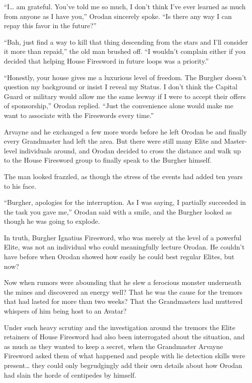\documentclass[a4paper,10pt]{book}
\begin{document}
“I… am grateful. You’ve told me so much, I don’t think I’ve ever learned as much from anyone as I have you,” Orodan sincerely spoke. “Is there any way I can repay this favor in the future?”\par
“Bah, just find a way to kill that thing descending from the stars and I’ll consider it more than repaid,” the old man brushed off. “I wouldn’t complain either if you decided that helping House Firesword in future loops was a priority.”\par
“Honestly, your house gives me a luxurious level of freedom. The Burgher doesn’t question my background or insist I reveal my Status. I don’t think the Capital Guard or military would allow me the same leeway if I were to accept their offers of sponsorship,” Orodan replied. “Just the convenience alone would make me want to associate with the Fireswords every time.”\par
Arvayne and he exchanged a few more words before he left Orodan be and finally every Grandmaster had left the area. But there were still many Elite and Master-level individuals around, and Orodan decided to cross the distance and walk up to the House Firesword group to finally speak to the Burgher himself.\par
The man looked frazzled, as though the stress of the events had added ten years to his face.\par
“Burgher, apologies for the interruption. As I was saying, I partially succeeded in the task you gave me,” Orodan said with a smile, and the Burgher looked as though he was going to explode.\par
\par
In truth, Burgher Ignatius Firesword, who was merely at the level of a powerful Elite, was not an individual who could meaningfully lecture Orodan. He couldn’t have before when Orodan showed how easily he could best regular Elites, but now?\par
Now when rumors were abounding that he slew a ferocious monster underneath the mines and discovered an energy well? That he was the cause for the tremors that had lasted for more than two weeks? That the Grandmasters had muttered whispers of him being host to an Avatar?\par
Under such heavy scrutiny and the investigation around the tremors the Elite retainers of House Firesword had also been interrogated about the situation, and as much as they wanted to keep a secret, when the Grandmaster Arvayne Firesword asked them of what happened and people with lie detection skills were present… they could only begrudgingly add their own details about how Orodan had slain the horde of centipedes by himself.\par
\end{document}
